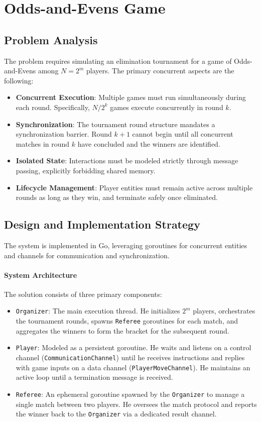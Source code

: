 \documentclass{scrartcl}
\begin{document}
\section{Odds-and-Evens Game}

\subsection{Problem Analysis}

The problem requires simulating an elimination tournament for a game of Odds-and-Evens among $N = 2^m$ players. The primary concurrent aspects are the following:

\begin{itemize}
    \item \textbf{Concurrent Execution}: Multiple games must run simultaneously during each round. Specifically, $N/2^k$ games execute concurrently in round $k$.
    \item \textbf{Synchronization}: The tournament round structure mandates a synchronization barrier. Round $k+1$ cannot begin until all concurrent matches in round $k$ have concluded and the winners are identified.
    \item \textbf{Isolated State}: Interactions must be modeled strictly through message passing, explicitly forbidding shared memory.
    \item \textbf{Lifecycle Management}: Player entities must remain active across multiple rounds as long as they win, and terminate safely once eliminated.
\end{itemize}

\subsection{Design and Implementation Strategy}

The system is implemented in Go, leveraging goroutines for concurrent entities and channels for communication and synchronization. 

\paragraph{System Architecture}
The solution consists of three primary components:
\begin{itemize}
    \item \texttt{Organizer}: The main execution thread. He initializes $2^m$ players, orchestrates the tournament rounds, spawns \texttt{Referee} goroutines for each match, and aggregates the winners to form the bracket for the subsequent round.
    \item \texttt{Player}: Modeled as a persistent goroutine. He waits and listens on a control channel (\texttt{CommunicationChannel}) until he receives instructions and replies with game inputs on a data channel (\texttt{PlayerMoveChannel}). He maintains an active loop until a termination message is received.
    \item \texttt{Referee}: An ephemeral goroutine spawned by the \texttt{Organizer} to manage a single match between two players. He oversees the match protocol and reports the winner back to the \texttt{Organizer} via a dedicated result channel.
\end{itemize}
\end{document}
